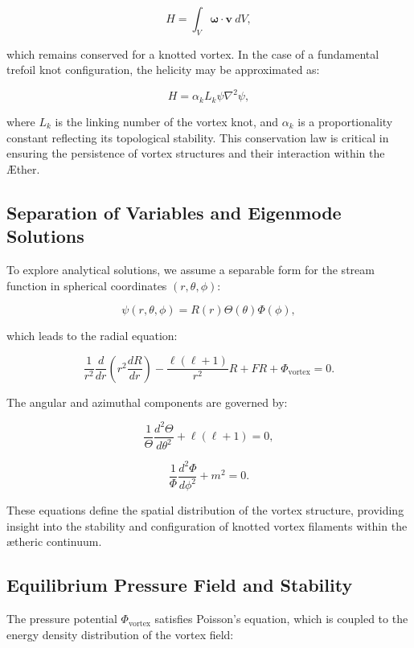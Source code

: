 \begin{equation*}
H = \int_V \boldsymbol{\omega} \cdot \mathbf{v} \ dV,
\end{equation*}

which remains conserved for a knotted vortex. In the case of a fundamental trefoil knot configuration, the helicity may be approximated as:

\begin{equation*}
H = \alpha_k L_k \psi \nabla^2 \psi,
\end{equation*}

where $L_k$ is the linking number of the vortex knot, and $\alpha_k$ is a proportionality constant reflecting its topological stability. This conservation law is critical in ensuring the persistence of vortex structures and their interaction within the Æther.

\subsection{Separation of Variables and Eigenmode Solutions}
To explore analytical solutions, we assume a separable form for the stream function in spherical coordinates $(r, \theta, \phi)$:

\begin{equation*}
\psi(r, \theta, \phi) = R(r) \Theta(\theta) \Phi(\phi),
\end{equation*}

which leads to the radial equation:

\begin{equation*}
\frac{1}{r^2} \frac{d}{dr} \left( r^2 \frac{dR}{dr} \right) - \frac{\ell (\ell+1)}{r^2} R + F R + \Phi_{\text{vortex}} = 0.
\end{equation*}

The angular and azimuthal components are governed by:

\begin{equation*}
\frac{1}{\Theta} \frac{d^2\Theta}{d\theta^2} + \ell(\ell+1) = 0,
\end{equation*}

\begin{equation*}
\frac{1}{\Phi} \frac{d^2\Phi}{d\phi^2} + m^2 = 0.
\end{equation*}

These equations define the spatial distribution of the vortex structure, providing insight into the stability and configuration of knotted vortex filaments within the ætheric continuum.

\subsection{Equilibrium Pressure Field and Stability}
The pressure potential $\Phi_{\text{vortex}}$ satisfies Poisson's equation, which is coupled to the energy density distribution of the vortex field:

